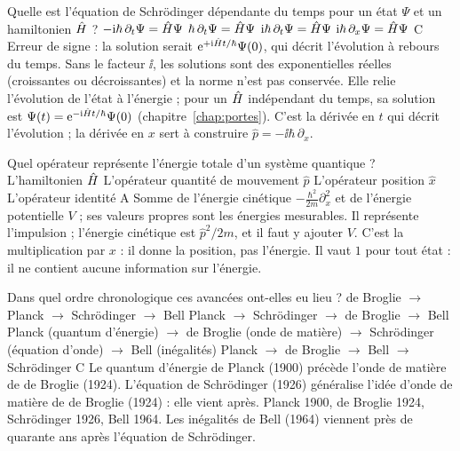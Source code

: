   {Quelle est l'équation de Schrödinger dépendante du temps pour un état $\Psi$ et un hamiltonien $\hat{H}$ ?}
  {$-\mathrm{i}\hbar\,\partial_t\Psi=\hat{H}\Psi$}
  {$\hbar\,\partial_t\Psi=\hat{H}\Psi$}
  {$\mathrm{i}\hbar\,\partial_t\Psi=\hat{H}\Psi$}
  {$\mathrm{i}\hbar\,\partial_x\Psi=\hat{H}\Psi$}
  {C}
\qcmx
  {Erreur de signe : la solution serait $\mathrm{e}^{+\mathrm{i}\hat{H} t/\hbar}\Psi(0)$, qui décrit l'évolution à rebours du temps.}
  {Sans le facteur $\ii$, les solutions sont des exponentielles réelles (croissantes ou décroissantes) et la norme n'est pas conservée.}
  {Elle relie l'évolution de l'état à l'énergie ; pour un $\hat{H}$ indépendant du temps, sa solution est $\Psi(t)=\mathrm{e}^{-\mathrm{i}\hat{H} t/\hbar}\Psi(0)$ (chapitre~\ref{chap:portes}).}
  {C'est la dérivée en $t$ qui décrit l'évolution ; la dérivée en $x$ sert à construire $\hat p=-\ii\hbar\,\partial_x$.}

  {Quel opérateur représente l'énergie totale d'un système quantique ?}
  {L'hamiltonien $\hat{H}$}
  {L'opérateur quantité de mouvement $\hat p$}
  {L'opérateur position $\hat x$}
  {L'opérateur identité}
  {A}
\qcmx
  {Somme de l'énergie cinétique $-\frac{\hbar^2}{2m}\partial_x^2$ et de l'énergie potentielle $V$ ; ses valeurs propres sont les énergies mesurables.}
  {Il représente l'impulsion ; l'énergie cinétique est $\hat p^2/2m$, et il faut y ajouter $V$.}
  {C'est la multiplication par $x$ : il donne la position, pas l'énergie.}
  {Il vaut $1$ pour tout état : il ne contient aucune information sur l'énergie.}

  {Dans quel ordre chronologique ces avancées ont-elles eu lieu ?}
  {de Broglie $\to$ Planck $\to$ Schrödinger $\to$ Bell}
  {Planck $\to$ Schrödinger $\to$ de Broglie $\to$ Bell}
  {Planck (quantum d'énergie) $\to$ de Broglie (onde de matière) $\to$ Schrödinger (équation d'onde) $\to$ Bell (inégalités)}
  {Planck $\to$ de Broglie $\to$ Bell $\to$ Schrödinger}
  {C}
\qcmx
  {Le quantum d'énergie de Planck (1900) précède l'onde de matière de de Broglie (1924).}
  {L'équation de Schrödinger (1926) généralise l'idée d'onde de matière de de Broglie (1924) : elle vient après.}
  {Planck 1900, de Broglie 1924, Schrödinger 1926, Bell 1964.}
  {Les inégalités de Bell (1964) viennent près de quarante ans après l'équation de Schrödinger.}

